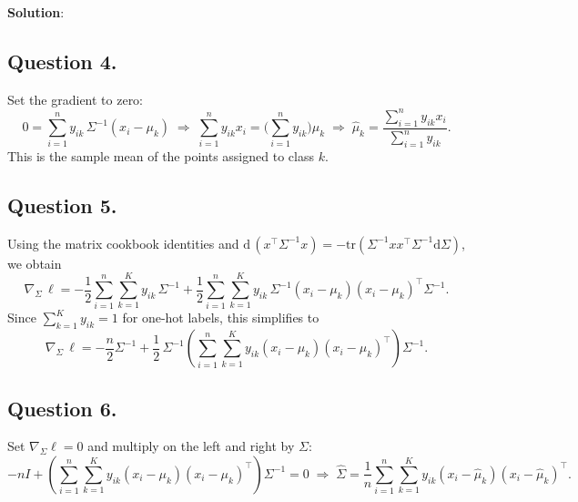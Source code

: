 \documentclass[submit]{../harvardml}
\newenvironment{solution}{
    \vspace{2mm}
    \color{blue}\noindent\textbf{Solution}:
}{}
\begin{document}
\begin{solution}
\subsection{Question 4.}

Set the gradient to zero:
\[
0=\sum_{i=1}^n y_{ik}\,\Sigma^{-1}(x_i-\mu_k)
\;\Longrightarrow\;
\sum_{i=1}^n y_{ik}x_i=\Big(\sum_{i=1}^n y_{ik}\Big)\mu_k
\;\Longrightarrow\;
\hat\mu_k=\frac{\sum_{i=1}^n y_{ik}x_i}{\sum_{i=1}^n y_{ik}}.
\]
This is the sample mean of the points assigned to class $k$.

\subsection{Question 5.}

Using the matrix cookbook identities and $\mathrm{d}\,(x^\top\Sigma^{-1}x)= -\mathrm{tr}(\Sigma^{-1}xx^\top\Sigma^{-1}\mathrm{d}\Sigma)$, we obtain
\[
\nabla_{\Sigma}\,\ell
=-\frac12\sum_{i=1}^n\sum_{k=1}^K y_{ik}\,\Sigma^{-1}
+\frac12\sum_{i=1}^n\sum_{k=1}^K y_{ik}\,\Sigma^{-1}(x_i-\mu_k)(x_i-\mu_k)^\top\Sigma^{-1}.
\]
Since $\sum_{k=1}^K y_{ik}=1$ for one-hot labels, this simplifies to
\[
\nabla_{\Sigma}\,\ell
=-\frac{n}{2}\Sigma^{-1}
+\frac12\,\Sigma^{-1}\!\left(\sum_{i=1}^n\sum_{k=1}^K y_{ik}(x_i-\mu_k)(x_i-\mu_k)^\top\right)\Sigma^{-1}.
\]
\subsection{Question 6.}

Set $\nabla_{\Sigma}\ell=0$ and multiply on the left and right by $\Sigma$:
\[
-nI+\left(\sum_{i=1}^n\sum_{k=1}^K y_{ik}(x_i-\mu_k)(x_i-\mu_k)^\top\right)\Sigma^{-1}=0
\;\Longrightarrow\;
\hat\Sigma=\frac{1}{n}\sum_{i=1}^n\sum_{k=1}^K y_{ik}(x_i-\hat\mu_k)(x_i-\hat\mu_k)^\top.
\]


\end{solution}

\newpage
\end{document}
